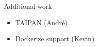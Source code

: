 \begin{frame}{Additional work}
	\begin{itemize}
		\item TAIPAN (André)
		\item Dockerize support (Kevin)
	\end{itemize}
\end{frame}
